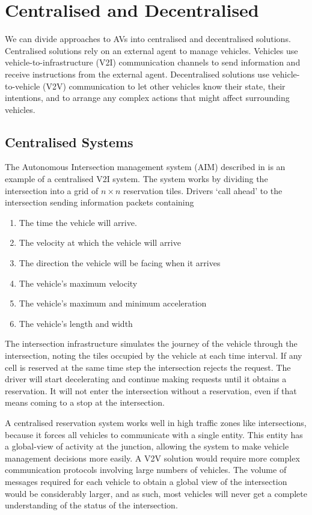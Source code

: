 \section{Centralised and Decentralised}
\label{sec:Centralised and Decentralised}
We can divide approaches to AVs into centralised and decentralised solutions. Centralised solutions rely on an external agent to manage vehicles. Vehicles use vehicle-to-infrastructure (V2I) communication channels to send information and receive instructions from the external agent. Decentralised solutions use vehicle-to-vehicle (V2V) communication to let other vehicles know their state, their intentions, and to arrange any complex actions that might affect surrounding vehicles.

\subsection{Centralised Systems}
\label{subsec:Centralised Systems}
The Autonomous Intersection management system (AIM) described in \citep{Dresner2004} is an example of a centralised V2I system. The system works by dividing the intersection into a grid of $n \times n$ reservation tiles. Drivers `call ahead' to the intersection sending information packets containing

\begin{enumerate}
\item The time the vehicle will arrive.
\item The velocity at which the vehicle will arrive
\item The direction the vehicle will be facing when it arrives
\item The vehicle's maximum velocity
\item The vehicle's maximum and minimum acceleration
\item The vehicle's length and width
\end{enumerate}

The intersection infrastructure simulates the journey of the vehicle through the intersection, noting the tiles occupied by the vehicle at each time interval. If any cell is reserved at the same time step the intersection rejects the request. The driver will start decelerating and continue making requests until it obtains a reservation. It will not enter the intersection without a reservation, even if that means coming to a stop at the intersection.

A centralised reservation system works well in high traffic zones like intersections, because it forces all vehicles to communicate with a single entity. This entity has a global-view of activity at the junction, allowing the system to make vehicle management decisions more easily. A V2V solution would require more complex communication protocols involving large numbers of vehicles. The volume of messages required for each vehicle to obtain a global view of the intersection would be considerably larger, and as such, most vehicles will never get a complete understanding of the status of the intersection.

